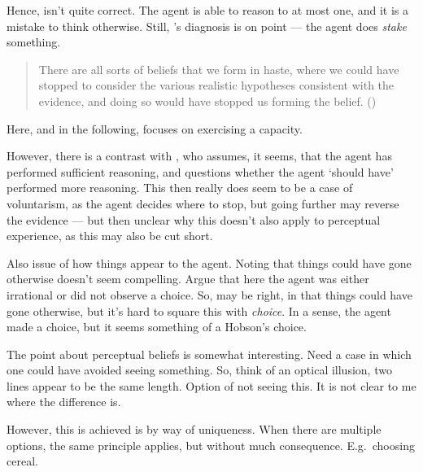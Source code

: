 \documentclass[10pt]{article}
\begin{document}
\begin{note}
  Hence, \citeauthor{Ginet:2001aa} isn't quite correct.
  The agent is able to reason to at most one, and it is a mistake to think otherwise.
  Still, \citeauthor{Ginet:2001aa}'s diagnosis is on point --- the agent does \emph{stake} something.

  \begin{quote}
    There are all sorts of beliefs that we form in haste, where we could have stopped to consider the various realistic hypotheses consistent with the evidence, and doing so would have stopped us forming the belief.\nolinebreak
    \mbox{}\hfill\mbox{(\citeyear[10]{Weatherson:2008uq})}
  \end{quote}
  Here, and in the following, \citeauthor{Weatherson:2008uq} focuses on exercising a capacity.

  However, there is a contrast with \citeauthor{Weatherson:2008uq}, who assumes, it seems, that the agent has performed sufficient reasoning, and questions whether the agent `should have' performed more reasoning.
  This then really does seem to be a case of voluntarism, as the agent decides where to stop, but going further may reverse the evidence --- but then unclear why this doesn't also apply to perceptual experience, as this may also be cut short.

  Also issue of how things appear to the agent.
  Noting that things could have gone otherwise doesn't seem compelling.
  Argue that here the agent was either irrational or did not observe a choice.
  So, \citeauthor{Weatherson:2008uq} may be right, in that things could have gone otherwise, but it's hard to square this with \emph{choice}.
  In a sense, the agent made a choice, but it seems something of a Hobson's choice.

  The point about perceptual beliefs is somewhat interesting.
  Need a case in which one could have avoided seeing something.
  So, think of an optical illusion, two lines appear to be the same length.
  Option of not seeing this.
  It is not clear to me where the difference is.

  However, this is achieved is by way of uniqueness.
  When there are multiple options, the same principle applies, but without much consequence.
  E.g.\ choosing cereal.
\end{note}
\end{document}
